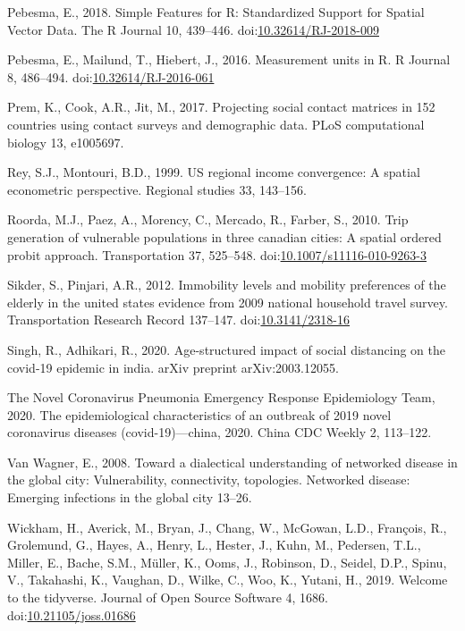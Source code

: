 \documentclass[]{elsarticle} %
\begin{document}
\leavevmode\hypertarget{ref-Pebesma2018}{}%
Pebesma, E., 2018. Simple Features for R: Standardized Support for
Spatial Vector Data. The R Journal 10, 439--446.
doi:\href{https://doi.org/10.32614/RJ-2018-009}{10.32614/RJ-2018-009}

\leavevmode\hypertarget{ref-Pebesma2016}{}%
Pebesma, E., Mailund, T., Hiebert, J., 2016. Measurement units in R. R
Journal 8, 486--494.
doi:\href{https://doi.org/10.32614/RJ-2016-061}{10.32614/RJ-2016-061}

\leavevmode\hypertarget{ref-Prem2017projecting}{}%
Prem, K., Cook, A.R., Jit, M., 2017. Projecting social contact matrices
in 152 countries using contact surveys and demographic data. PLoS
computational biology 13, e1005697.

\leavevmode\hypertarget{ref-Rey1999us}{}%
Rey, S.J., Montouri, B.D., 1999. US regional income convergence: A
spatial econometric perspective. Regional studies 33, 143--156.

\leavevmode\hypertarget{ref-Roorda2010trip}{}%
Roorda, M.J., Paez, A., Morency, C., Mercado, R., Farber, S., 2010. Trip
generation of vulnerable populations in three canadian cities: A spatial
ordered probit approach. Transportation 37, 525--548.
doi:\href{https://doi.org/10.1007/s11116-010-9263-3}{10.1007/s11116-010-9263-3}

\leavevmode\hypertarget{ref-Sikder2012immobility}{}%
Sikder, S., Pinjari, A.R., 2012. Immobility levels and mobility
preferences of the elderly in the united states evidence from 2009
national household travel survey. Transportation Research Record
137--147. doi:\href{https://doi.org/10.3141/2318-16}{10.3141/2318-16}

\leavevmode\hypertarget{ref-Singh2020age}{}%
Singh, R., Adhikari, R., 2020. Age-structured impact of social
distancing on the covid-19 epidemic in india. arXiv preprint
arXiv:2003.12055.

\leavevmode\hypertarget{ref-Novel2020epidemiological}{}%
The Novel Coronavirus Pneumonia Emergency Response Epidemiology Team,
2020. The epidemiological characteristics of an outbreak of 2019 novel
coronavirus diseases (covid-19)---china, 2020. China CDC Weekly 2,
113--122.

\leavevmode\hypertarget{ref-vanWagner2008toward}{}%
Van Wagner, E., 2008. Toward a dialectical understanding of networked
disease in the global city: Vulnerability, connectivity, topologies.
Networked disease: Emerging infections in the global city 13--26.

\leavevmode\hypertarget{ref-Wickham2019}{}%
Wickham, H., Averick, M., Bryan, J., Chang, W., McGowan, L.D., François,
R., Grolemund, G., Hayes, A., Henry, L., Hester, J., Kuhn, M., Pedersen,
T.L., Miller, E., Bache, S.M., Müller, K., Ooms, J., Robinson, D.,
Seidel, D.P., Spinu, V., Takahashi, K., Vaughan, D., Wilke, C., Woo, K.,
Yutani, H., 2019. Welcome to the tidyverse. Journal of Open Source
Software 4, 1686.
doi:\href{https://doi.org/10.21105/joss.01686}{10.21105/joss.01686}
\end{document}
